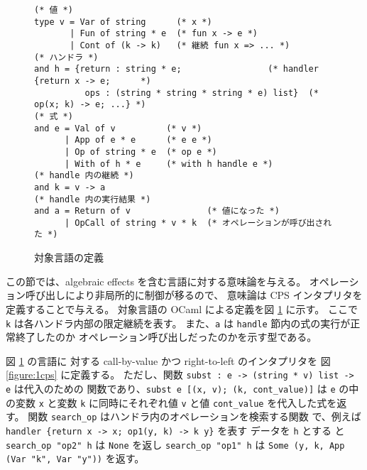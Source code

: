 \begin{figure}
\begin{verbatim}
(* 値 *)
type v = Var of string      (* x *)
       | Fun of string * e  (* fun x -> e *)
       | Cont of (k -> k)   (* 継続 fun x => ... *)
(* ハンドラ *)
and h = {return : string * e;                 (* handler {return x -> e;      *)
          ops : (string * string * string * e) list}  (*  op(x; k) -> e; ...} *)
(* 式 *)
and e = Val of v          (* v *)
      | App of e * e      (* e e *)
      | Op of string * e  (* op e *)
      | With of h * e     (* with h handle e *)
(* handle 内の継続 *)
and k = v -> a
(* handle 内の実行結果 *)
and a = Return of v               (* 値になった *)
      | OpCall of string * v * k  (* オペレーションが呼び出された *)
\end{verbatim}
\caption{対象言語の定義}
\label{figure:syntax}
\end{figure}

この節では、algebraic effects を含む言語に対する意味論を与える。
オペレーション呼び出しにより非局所的に制御が移るので、
意味論は CPS インタプリタを定義することで与える。
対象言語の OCaml による定義を図 \ref{figure:syntax} に示す。
ここで \texttt{k} は各ハンドラ内部の限定継続を表す。
また、\texttt{a} は \texttt{handle} 節内の式の実行が正常終了したのか
オペレーション呼び出しだったのかを示す型である。



図 \ref{figure:syntax} の言語に
対する call-by-value かつ right-to-left のインタプリタを
図 \ref{figure:1cps} に定義する。
ただし、関数 \texttt{subst :\ e -> (string * v) list -> e} は代入のための
関数であり、\texttt{subst e [(x, v); (k, cont\_value)]} は \texttt{e}
の中の変数 \texttt{x} と変数 \texttt{k} に同時にそれぞれ値 \texttt{v}
と値 \texttt{cont\_value} を代入した式を返す。
関数 \texttt{search\_op} はハンドラ内のオペレーションを検索する関数
で、例えば \texttt{handler \{return x -> x; op1(y, k) -> k y\}} を表す
データを \texttt{h} とする
と \texttt{search\_op "op2" h} は \texttt{None} を返し
\texttt{search\_op "op1" h} は \texttt{Some (y, k, App (Var "k", Var
"y"))} を返す。


